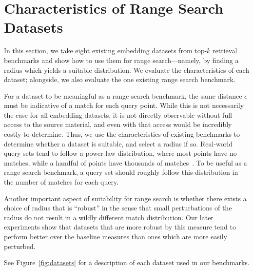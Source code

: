 \section{Characteristics of Range Search Datasets}\label{sec:rangedata}

In this section, we take eight existing embedding datasets from top-$k$ retrieval benchmarks and show how to use them for range search---namely, by finding a radius which yields a suitable distribution. We evaluate the characteristics of each dataset; alongside, we also evaluate the one existing range search benchmark. 

For a dataset to be meaningful as a range search benchmark, the same distance $\epsilon$ must be indicative of a match for each query point. While this is not necessarily the case for all embedding datasets, it is not directly observable without full access to the source material, and even with that access would be incredibly costly to determine. Thus, we use the characteristics of existing benchmarks to determine whether a dataset is suitable, and select a radius if so. Real-world query sets tend to follow a power-law distribution, where most points have no matches, while a handful of points have thousands of matches~\cite{szilvasy2024vector,simsearchnet}. To be useful as a range search benchmark, a query set should roughly follow this distribution in the number of matches for each query. 

Another important aspect of suitability for range search is whether there exists a choice of radius that is ``robust'' in the sense that small perturbations of the radius do not result in a wildly different match distribution. Our later experiments show that datasets that are more robust by this measure tend to perform better over the baseline measures than ones which are more easily perturbed.

See Figure~\ref{fig:datasets} for a description of each dataset used in our benchmarks.

